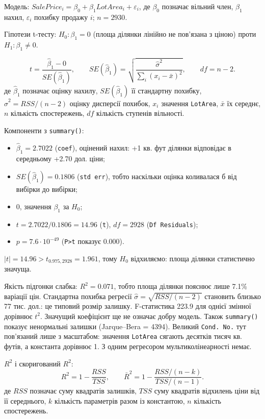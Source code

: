 \answerheading
Модель: \(SalePrice_i=\beta_0+\beta_1 LotArea_i+\varepsilon_i\), де
\(\beta_0\) позначає вільний член, \(\beta_1\) нахил, \(\varepsilon_i\)
похибку продажу \(i\); \(n=2930\).

Гіпотези t-тесту: \(H_0:\beta_1=0\) (площа ділянки лінійно не пов'язана
з ціною) проти \(H_1:\beta_1\ne0\).

\[t=\frac{\widehat\beta_1-0}{SE(\widehat\beta_1)},\qquad SE(\widehat\beta_1)=\sqrt{\frac{\widehat\sigma^2}{\sum_i(x_i-\bar x)^2}},\qquad df=n-2.\]
де \(\widehat\beta_1\) позначає оцінку нахилу, \(SE(\widehat\beta_1)\)
її стандартну похибку, \(\widehat\sigma^2=RSS/(n-2)\) оцінку дисперсії
похибок, \(x_i\) значення \texttt{LotArea}, \(\bar x\) їх середнє, \(n\)
кількість спостережень, \(df\) кількість ступенів вільності.

Компоненти з \texttt{summary()}:

\begin{itemize}
\item
  \(\widehat\beta_1=2.7022\) (\texttt{coef}), оцінений нахил: +1 кв. фут
  ділянки відповідає в середньому +2.70 дол. ціни;
\item
  \(SE(\widehat\beta_1)=0.1806\) (\texttt{std\ err}), тобто наскільки
  оцінка коливалася б від вибірки до вибірки;
\item
  0, значення \(\beta_1\) за \(H_0\);
\item
  \(t=2.7022/0.1806=14.96\) (\texttt{t}), \(df=2928\)
  (\texttt{Df\ Residuals});
\item
  \(p=7.6\cdot10^{-49}\) (\texttt{P\textgreater{}\textbar{}t\textbar{}}
  показує 0.000).
\end{itemize}

\(|t|=14.96>t_{0.975,2928}=1.961\), тому \(H_0\) відхиляємо: площа
ділянки статистично значуща.

Якість підгонки слабка: \(R^2=0.071\), тобто площа ділянки пояснює лише
7.1\% варіації цін. Стандартна похибка регресії
\(\widehat\sigma=\sqrt{RSS/(n-2)}\) становить близько 77 тис. дол.: це
типовий розмір залишку. F-статистика 223.9 для однієї змінної дорівнює
\(t^2\). Значущий коефіцієнт ще не означає добру модель. Також
\texttt{summary()} показує ненормальні залишки (Jarque--Bera = 4394).
Великий \texttt{Cond.\ No.} тут пов'язаний лише з масштабом: значення
\texttt{LotArea} сягають десятків тисяч кв. футів, а константа дорівнює
1. З одним регресором мультиколінеарності немає.

\(R^2\) і скоригований \(R^2\):
\[R^2=1-\frac{RSS}{TSS},\qquad \bar R^2=1-\frac{RSS/(n-k)}{TSS/(n-1)}.\]
де \(RSS\) позначає суму квадратів залишків, \(TSS\) суму квадратів
відхилень ціни від її середнього, \(k\) кількість параметрів разом із
константою, \(n\) кількість спостережень.

